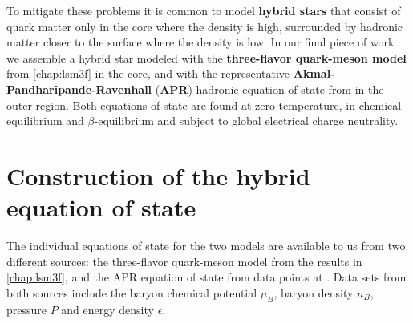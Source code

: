 To mitigate these problems it is common to model \textbf{hybrid stars} that consist of
quark matter only in the core where the density is high, 
surrounded by hadronic matter closer to the surface where the density is low.
In our final piece of work
we assemble a hybrid star modeled with the \textbf{three-flavor quark-meson model} from \cref{chap:lsm3f} in the core,
and with the representative \textbf{Akmal-Pandharipande-Ravenhall} (\textbf{APR}) hadronic equation of state from \cite{ref:apr} in the outer region.
Both equations of state are found at zero temperature, in chemical equilibrium and $\beta$-equilibrium and subject to global electrical charge neutrality.

\section{Construction of the hybrid equation of state}
\label{sec:hybrid:construction}

The individual equations of state for the two models are available to us from two different sources:
the three-flavor quark-meson model from the results in \cref{chap:lsm3f},
and the APR equation of state from data points at \cite{ref:apr_data}.
Data sets from both sources include the baryon chemical potential $\mu_B$, baryon density $n_B$, pressure $P$ and energy density $\epsilon$.

